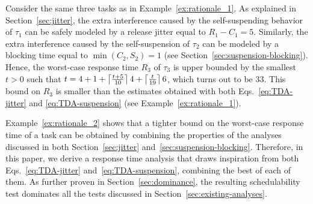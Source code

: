 \begin{example}
\label{ex:rationale_2}  
Consider the same three tasks as in Example~\ref{ex:rationale_1}. As explained in Section~\ref{sec:jitter}, the extra interference caused by the self-suspending behavior of $\tau_1$ can be safely modeled by a release jitter equal to $R_1 - C_1 = 5$. Similarly, the extra interference caused by the self-suspension of $\tau_2$ can be modeled by a blocking time equal to $\min(C_2,S_2) = 1$ (see Section~\ref{sec:suspension-blocking}). Hence, the worst-case response time $R_3$ of $\tau_3$ is upper bounded by the smallest $t>0$ such that $t = 4 + 1 +\left\lceil{ \frac{t + 5}{10} }\right\rceil 4 +\left\lceil{ \frac{t}{19} }\right\rceil 6$, which turns out to be $33$. This bound on $R_3$ is smaller than the estimates obtained with both Eqs.~\eqref{eq:TDA-jitter} and \eqref{eq:TDA-suspension} (see Example~\ref{ex:rationale_1}).
\hfill\myendproof
\end{example}


Example~\ref{ex:rationale_2} shows that a tighter bound on the worst-case response time of a task can be obtained by combining the properties of the analyses discussed in both Section~\ref{sec:jitter} and~\ref{sec:suspension-blocking}. Therefore, in this paper, we derive a response time analysis that draws inspiration from both Eqs.~\eqref{eq:TDA-jitter} and~\eqref{eq:TDA-suspension}, combining the best of each of them. As further proven in Section~\ref{sec:dominance}, the resulting schedulability test dominates all the tests discussed in Section~\ref{sec:existing-analyses}.




